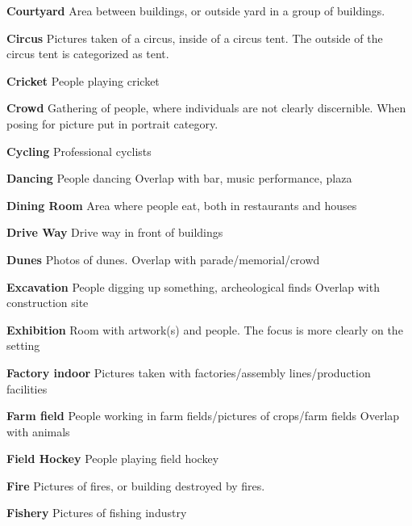 \noindent\textbf{Courtyard}
Area between buildings, or outside yard in a group of buildings. 

\noindent\textbf{Circus}
Pictures taken of a circus, inside of a circus tent. The outside of the circus tent is categorized as tent.  

\noindent\textbf{Cricket}
People playing cricket


\noindent\textbf{Crowd}
Gathering of people, where individuals are not clearly discernible. When posing for picture put in portrait category.

\noindent\textbf{Cycling}
Professional cyclists

\noindent\textbf{Dancing}
People dancing
Overlap with bar, music performance, plaza

\noindent\textbf{Dining Room}
Area where people eat, both in restaurants and houses


\noindent\textbf{Drive Way}
Drive way in front of buildings

\noindent\textbf{Dunes}
Photos of dunes.
Overlap with parade/memorial/crowd

\noindent\textbf{Excavation}
People digging up something, archeological finds
Overlap with construction site

\noindent\textbf{Exhibition}
Room with artwork(s) and people. The focus is more clearly on the setting

\noindent\textbf{Factory indoor}
Pictures taken with factories/assembly lines/production facilities



\noindent\textbf{Farm field}
People working in farm fields/pictures of crops/farm fields
Overlap with animals

\noindent\textbf{Field Hockey}
People playing field hockey


\noindent\textbf{Fire}
Pictures of fires, or building destroyed by fires. 

\noindent\textbf{Fishery}
Pictures of fishing industry

